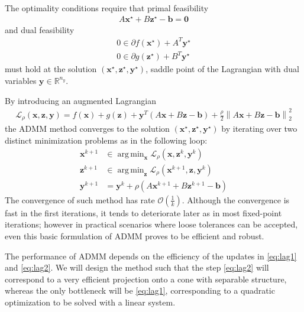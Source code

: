 \documentclass[final,3p]{elsarticle}
\newcommand{\vect}[1]{\bm{#1}}
\newcommand{\norm}[1]{\left\lVert#1\right\rVert}
\DeclareMathOperator*{\argmin}{arg\,min} %
\begin{document}
The optimality conditions require that primal feasibility
\begin{align}
A \vect{x}^\star + B \vect{z}^\star - \vect{b} = \vect{0} \label{eq:primalfeasibility1}
\end{align}
and dual feasibility
\begin{subequations}
	\begin{align}
     0 \in \partial	f(\vect{x}^\star) + A^T \vect{y}^\star \label{eq:dualfeasibility1}\\
	   0 \in \partial	g(\vect{z}^\star) + B^T \vect{y}^\star \label{eq:dualfeasibility2}
	\end{align}
	\label{eq:admm}
\end{subequations}
must hold at the solution $(\vect{x}^\star,\vect{z}^\star,\vect{y}^\star)$, saddle point of the Lagrangian with dual variables $\vect{y} \in \mathbb{R}^{n_y}$.

By introducing an augmented Lagrangian
\begin{align}
\mathcal{L}_{\rho}(\vect{x},\vect{z},\vect{y})= f(\vect{x}) + g(\vect{z}) + \vect{y}^T (A \vect{x} + B \vect{z} - \vect{b}) + \frac{\rho}{2} \norm{A \vect{x} + B \vect{z} - \vect{b}}_2^2
\end{align}
the ADMM method converges to the solution $(\vect{x}^\star,\vect{z}^\star,\vect{y}^\star)$ by iterating over two distinct minimization problems as in the following loop:
\begin{align}
 \vect{x}^{k+1} &\in \argmin_{\vect{x}} \mathcal{L}_{\rho}(\vect{x},\vect{z}^k,\vect{y}^k) \label{eq:lag1}\\
 \vect{z}^{k+1} &\in \argmin_{\vect{z}} \mathcal{L}_{\rho}(\vect{x}^{k+1},\vect{z},\vect{y}^k) \label{eq:lag2}\\
 \vect{y}^{k+1} &= \vect{y}^{k} + \rho ( A \vect{x}^{k+1} + B \vect{z}^{k+1} - \vect{b} )
 \label{eq:admm_iters}
\end{align}
The convergence of such method has rate $\mathcal{O}\left(\frac{1}{k}\right)$.
Although the convergence is fast in the first iterations, it tends to deteriorate later as in most fixed-point iterations; however in practical scenarios where loose tolerances can be accepted, even this basic formulation of ADMM proves to be efficient and robust.

The performance of ADMM depends on the efficiency of the updates in \eqref{eq:lag1} and \eqref{eq:lag2}. We will design the method such that the step \eqref{eq:lag2} will correspond to a very efficient projection onto a cone with separable structure, whereas the only bottleneck will be \eqref{eq:lag1}, corresponding to a quadratic optimization to be solved with a linear system.
\end{document}

